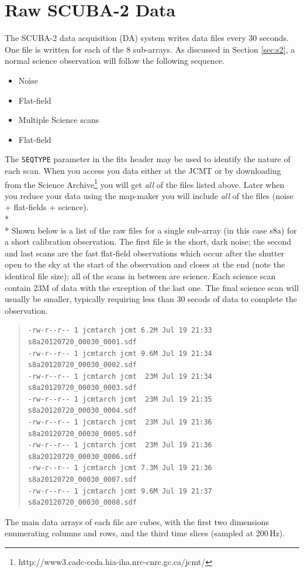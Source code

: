 \documentclass[twoside,11pt]{article}
\newcommand{\xlabel}[1]{}
\renewcommand{\_}{\texttt{\symbol{95}}}
\newenvironment{myquote}{\begin{quote}\begin{small}}{\end{small}\end{quote}}
\newcommand{\param}[1]{\texttt{#1}}
\begin{document}
\section{\xlabel{data_files}Raw SCUBA-2 Data}
\label{sec:raw}
The SCUBA-2 data acquisition (DA) system writes data files every 30 seconds. One file is written for each of the 8 sub-arrays. As discussed in Section \ref{sec:s2}, a normal science observation will follow the following sequence.
\vspace{-2mm} 
\begin{itemize}\itemsep-0.5em
\item Noise
\item Flat-field
\item Multiple Science scans
\item Flat-field
\end{itemize}
\vspace{-2mm}
The \param{SEQ\_TYPE} parameter in the fits header may be used to identify the nature of each scan. When you access you data either at the JCMT or by downloading from the Science Archive\footnote{http://www3.cadc-ccda.hia-iha.nrc-cnrc.gc.ca/jcmt/} you will get \emph{all} of the files listed above. Later when you reduce your data using the map-maker you will include \emph{all} of the files (noise + flat-fields + science).
\\*\\*
Shown below is a list of the raw files for a single sub-array (in this case s8a) for a short calibration observation. The first file is the short, dark noise; the second and last scans are the fast flat-field observations which occur after the shutter open to the sky at the start of the observation and closes at the end (note the identical file size); all of the scans in between are science. Each science scan contain 23M of data with the exception of the last one. 
The final science scan will usually be smaller, typically requiring less than 30 secods of data to complete the observation.
\begin{myquote}
\begin{verbatim}
-rw-r--r-- 1 jcmtarch jcmt 6.2M Jul 19 21:33 s8a20120720_00030_0001.sdf
-rw-r--r-- 1 jcmtarch jcmt 9.6M Jul 19 21:34 s8a20120720_00030_0002.sdf
-rw-r--r-- 1 jcmtarch jcmt  23M Jul 19 21:34 s8a20120720_00030_0003.sdf
-rw-r--r-- 1 jcmtarch jcmt  23M Jul 19 21:35 s8a20120720_00030_0004.sdf
-rw-r--r-- 1 jcmtarch jcmt  23M Jul 19 21:36 s8a20120720_00030_0005.sdf
-rw-r--r-- 1 jcmtarch jcmt  23M Jul 19 21:36 s8a20120720_00030_0006.sdf
-rw-r--r-- 1 jcmtarch jcmt 7.3M Jul 19 21:36 s8a20120720_00030_0007.sdf
-rw-r--r-- 1 jcmtarch jcmt 9.6M Jul 19 21:37 s8a20120720_00030_0008.sdf
\end{verbatim}
\end{myquote}
The main data arrays of each file are cubes, with the first two dimensions enumerating columns and rows, and the third time slices (sampled at 200\,Hz).
\end{document}
